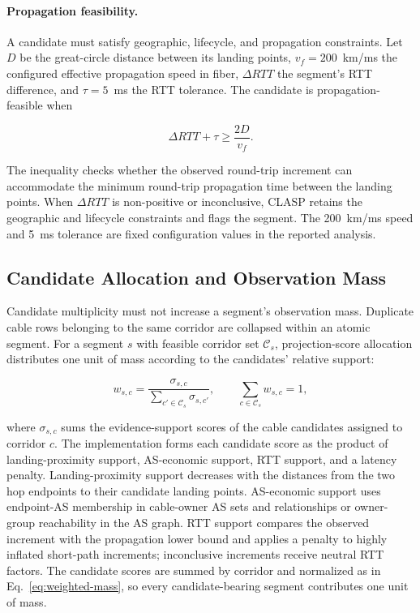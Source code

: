 \paragraph{Propagation feasibility.}
A candidate must satisfy geographic, lifecycle, and propagation constraints.
Let \(D\) be the great-circle distance between its landing points,
\(v_f=200\)~km/ms the configured effective propagation speed in fiber,
\(\Delta RTT\) the segment's RTT difference, and \(\tau=5\)~ms the RTT
tolerance. The candidate is propagation-feasible when

\begin{equation}
  \Delta RTT + \tau \geq \frac{2D}{v_f}.
  \label{eq:rtt-feasibility}
\end{equation}

The inequality checks whether the observed round-trip increment can accommodate
the minimum round-trip propagation time between the landing points. When
\(\Delta RTT\) is non-positive or inconclusive, CLASP retains the geographic
and lifecycle constraints and flags the segment. The 200~km/ms speed and
5~ms tolerance are fixed configuration values in the reported analysis.

\subsection{Candidate Allocation and Observation Mass}
\label{sec:framework_allocation}

Candidate multiplicity must not increase a segment's observation mass.
Duplicate cable rows belonging to the same corridor are collapsed within
an atomic segment. For a segment \(s\) with feasible corridor set
\(\mathcal{C}_s\), projection-score allocation distributes one unit of mass
according to the candidates' relative support:

\begin{equation}
  w_{s,c}=
  \frac{\sigma_{s,c}}
       {\sum_{c'\in\mathcal{C}_s}\sigma_{s,c'}},
  \qquad
  \sum_{c\in\mathcal{C}_s}w_{s,c}=1,
  \label{eq:weighted-mass}
\end{equation}

where \(\sigma_{s,c}\) sums the evidence-support scores of the cable candidates
assigned to corridor \(c\). The implementation forms each candidate score
as the product of landing-proximity support, AS-economic support, RTT
support, and a latency penalty. Landing-proximity support decreases with
the distances from the two hop endpoints to their candidate landing points.
AS-economic support uses endpoint-AS membership in cable-owner AS sets and
relationships or owner-group reachability in the AS graph. RTT support
compares the observed increment with the propagation lower bound and applies
a penalty to highly inflated short-path increments; inconclusive increments
receive neutral RTT factors. The candidate scores are summed by corridor
and normalized as in Eq.~\eqref{eq:weighted-mass}, so every candidate-bearing
segment contributes one unit of mass.

